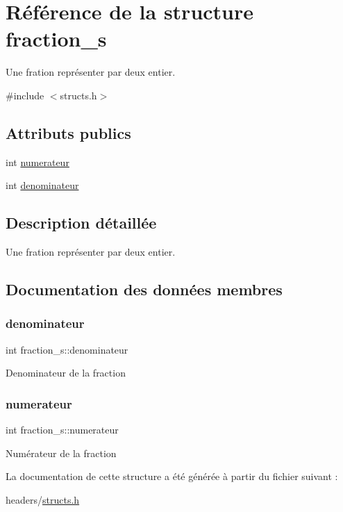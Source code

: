 \hypertarget{structfraction__s}{}\section{Référence de la structure fraction\+\_\+s}
\label{structfraction__s}


Une fration représenter par deux entier.  




{\ttfamily \#include $<$structs.\+h$>$}

\subsection*{Attributs publics}
\begin{DoxyCompactItemize}
\item 
int \hyperlink{structfraction__s_ae64276e77a47e70484fbae621d2802d2}{numerateur}
\item 
int \hyperlink{structfraction__s_ad0c0bf49a85a94db886faf62f9a86677}{denominateur}
\end{DoxyCompactItemize}


\subsection{Description détaillée}
Une fration représenter par deux entier. 

\subsection{Documentation des données membres}
\mbox{\label{structfraction__s_ad0c0bf49a85a94db886faf62f9a86677}} 
\subsubsection{\texorpdfstring{denominateur}{denominateur}}
{\footnotesize\ttfamily int fraction\+\_\+s\+::denominateur}

Denominateur de la fraction \mbox{\label{structfraction__s_ae64276e77a47e70484fbae621d2802d2}} 
\subsubsection{\texorpdfstring{numerateur}{numerateur}}
{\footnotesize\ttfamily int fraction\+\_\+s\+::numerateur}

Numérateur de la fraction 

La documentation de cette structure a été générée à partir du fichier suivant \+:\begin{DoxyCompactItemize}
\item 
headers/\hyperlink{structs_8h}{structs.\+h}\end{DoxyCompactItemize}
